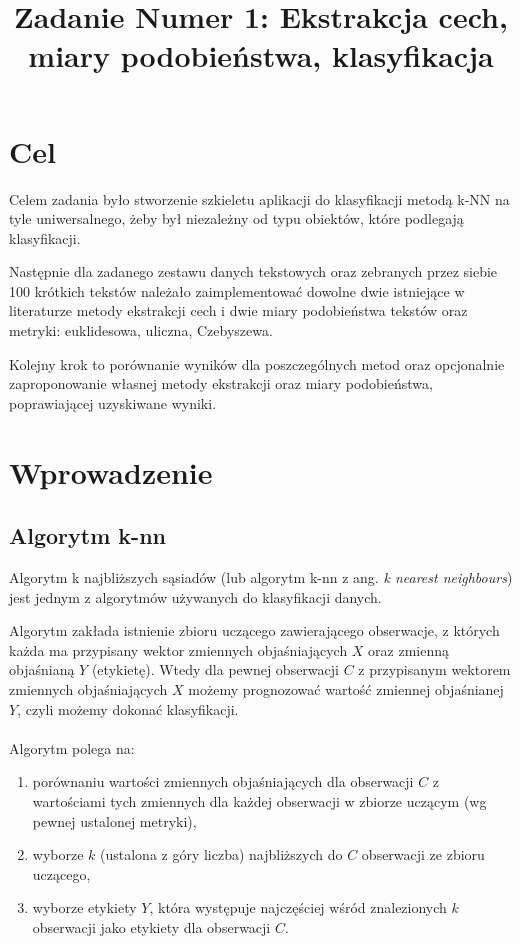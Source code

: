 \documentclass{classrep}
\author{
  \studentinfo{Michał Janiszewski}{169485} \and
  \studentinfo{Mariusz Łucka}{169493}
}
\title{Zadanie Numer 1: Ekstrakcja cech, miary podobieństwa, klasyfikacja}
\begin{document}
\maketitle

\section{Cel}
Celem zadania było stworzenie szkieletu aplikacji do klasyfikacji metodą k-NN na tyle uniwersalnego, żeby był niezależny od typu obiektów, które podlegają klasyfikacji.

Następnie dla zadanego zestawu danych tekstowych oraz zebranych przez siebie 100 krótkich tekstów należało zaimplementować dowolne dwie istniejące w literaturze metody ekstrakcji cech i dwie miary podobieństwa tekstów oraz metryki: euklidesowa, uliczna, Czebyszewa.

Kolejny krok to porównanie wyników dla poszczególnych metod oraz opcjonalnie zaproponowanie własnej metody ekstrakcji oraz miary podobieństwa, poprawiającej uzyskiwane wyniki. 

\section{Wprowadzenie}
\subsection{Algorytm k-nn}
Algorytm k najbliższych sąsiadów (lub algorytm k-nn z ang. \textit{k nearest neighbours}) jest jednym z algorytmów używanych do klasyfikacji danych. 

Algorytm zakłada istnienie zbioru uczącego zawierającego obserwacje, z których każda ma przypisany wektor zmiennych objaśniających $X$ oraz zmienną objaśnianą $Y$ (etykietę). Wtedy dla pewnej obserwacji $C$ z przypisanym wektorem zmiennych objaśniających $X$ możemy prognozować wartość zmiennej objaśnianej $Y$, czyli możemy dokonać klasyfikacji.

\paragraph{}
Algorytm polega na:

\begin{enumerate}
\item porównaniu wartości zmiennych objaśniających dla obserwacji $C$ z wartościami tych zmiennych dla każdej obserwacji w zbiorze uczącym (wg pewnej ustalonej metryki),
\item wyborze $k$ (ustalona z góry liczba) najbliższych do $C$ obserwacji ze zbioru uczącego,
\item wyborze etykiety $Y$, która występuje najczęściej wśród znalezionych $k$ obserwacji jako etykiety dla obserwacji $C$. 
\end{enumerate}
\end{document}
